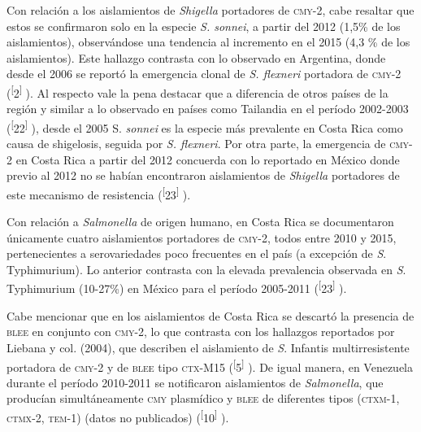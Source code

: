 \documentclass{article}
\begin{document}
Con relación a los aislamientos de \textit{Shigella}
portadores de \textsc{cmy}-2, cabe resaltar que estos se confirmaron solo en la especie
\textit{S. sonnei}, a partir del 2012 (1,5\% de los aislamientos), observándose una tendencia al
incremento en el 2015 (4,3 \% de los aislamientos). Este hallazgo contrasta con
lo observado en Argentina, donde desde el 2006 se reportó la emergencia clonal
de \textit{S. flexneri}
portadora de \textsc{cmy}-2 (\textsuperscript{[}2\textsuperscript{]}
). Al respecto vale la pena destacar que a diferencia de otros países de la
región y similar a lo observado en países como Tailandia en el período 2002-2003
(\textsuperscript{[}22\textsuperscript{]}
), desde el 2005 S. \textit{sonnei}
es la especie más prevalente en Costa Rica como causa de shigelosis, seguida por
\textit{S. flexneri}. Por otra parte, la emergencia de \textsc{cmy}-2 en Costa Rica a partir del 2012
concuerda con lo reportado en México donde previo al 2012 no se habían
encontraron aislamientos de \textit{Shigella}
portadores de este mecanismo de resistencia
(\textsuperscript{[}23\textsuperscript{]}
).

Con relación a \textit{Salmonella}
de origen humano, en Costa Rica se documentaron únicamente cuatro aislamientos
portadores de \textsc{cmy}-2, todos entre 2010 y 2015, pertenecientes a serovariedades
poco frecuentes en el país (a excepción de \textit{S}. Typhimurium). Lo anterior contrasta con la elevada prevalencia observada en
\textit{S}. Typhimurium (10-27\%) en México para el período 2005-2011
(\textsuperscript{[}23\textsuperscript{]}
).

Cabe mencionar que en los aislamientos de Costa Rica se descartó la presencia de
\textsc{blee} en conjunto con \textsc{cmy}-2, lo que contrasta con los hallazgos reportados por
Liebana y col. (2004), que describen el aislamiento de \textit{S}. Infantis multirresistente portadora de \textsc{cmy}-2 y de \textsc{blee} tipo \textsc{ctx}-M15
(\textsuperscript{[}5\textsuperscript{]}
). De igual manera, en Venezuela durante el período 2010-2011 se notificaron
aislamientos de \textit{Salmonella}, que producían simultáneamente \textsc{cmy} plasmídico y \textsc{blee} de diferentes tipos
(\textsc{ctxm}-1, \textsc{ctmx}-2, \textsc{tem}-1) (datos no publicados)
(\textsuperscript{[}10\textsuperscript{]}
).
\end{document}
